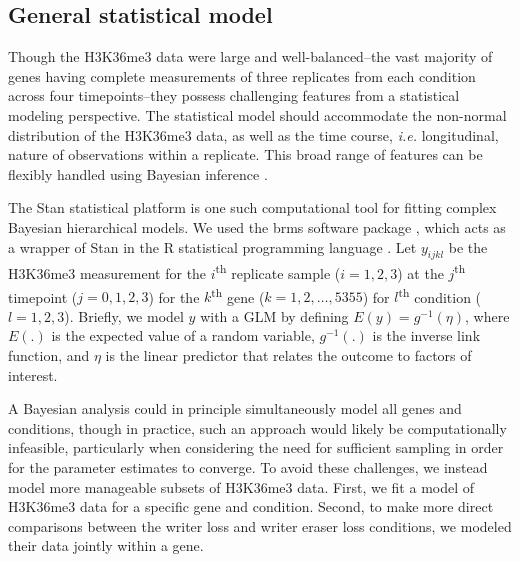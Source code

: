 \documentclass[11pt]{biorxiv}
\newcommand{\ie}{\emph{i.e.}\xspace}
\begin{document}
\subsection{General statistical model}
Though the H3K36me3 data were large and well-balanced--the vast majority of genes having complete measurements of three replicates from each condition across four timepoints--they possess challenging features from a statistical modeling perspective. The statistical model should accommodate the non-normal distribution of the H3K36me3 data, as well as the time course, \ie longitudinal, nature of observations within a replicate. This broad range of features can be flexibly handled using Bayesian inference \citep{Gelman2006, Gelman2013}. 
	
The Stan statistical platform \citep{Carpenter2017} is one such computational tool for fitting complex Bayesian hierarchical models. We used the brms software package \citep{Burkner2017, Burkner2018}, which acts as a wrapper of Stan in the R statistical programming language \citep{RCoreTeam2019}. Let $y_{ijkl}$ be the H3K36me3 measurement for the $i$\textsuperscript{th} replicate sample ($i=1,2,3$) at the $j$\textsuperscript{th} timepoint ($j=0,1,2,3$) for the $k$\textsuperscript{th} gene ($k=1,2,…,5355$) for $l$\textsuperscript{th} condition ($l=1,2,3$). Briefly, we model $y$ with a GLM by defining $E(y)=g^{-1}(\eta)$, where $E(.)$ is the expected value of a random variable, $g^{-1}(.)$ is the inverse link function, and $\eta$ is the linear predictor that relates the outcome to factors of interest.

A Bayesian analysis could in principle simultaneously model all genes and conditions, though in practice, such an approach would likely be computationally infeasible, particularly when considering the need for sufficient sampling in order for the parameter estimates to converge. To avoid these challenges, we instead model more manageable subsets of H3K36me3 data. First, we fit a model of H3K36me3 data for a specific gene and condition. Second, to make more direct comparisons between the writer loss and writer eraser loss conditions, we modeled their data jointly within a gene.
	
\end{document}
